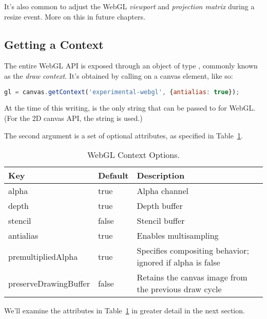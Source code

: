 \begin{sidenote}
It's also common to adjust the WebGL \emph{viewport} and \emph{projection matrix} during a resize event.  More on this in future chapters.
\end{sidenote}

\subsection{Getting a Context}
\label{sec:context}

The entire WebGL API is exposed through an object of type  , commonly known as the  \emph{draw context}.  It's obtained by calling   on a canvas element, like so:

\begin{lstlisting}[language=JavaScript]
  gl = canvas.getContext('experimental-webgl', {antialias: true});
\end{lstlisting}

At the time of this writing,   is the only string that can be passed to  for WebGL.  (For the 2D canvas API, the string  is used.)

The second argument is a set of optional attributes, as specified in Table~\ref{tab:ContextAttributes}.

\begin{table}[htb]\centering
  \begin{tabular}{lll}
    \hline
    Key & Default & Description \\
    \hline
    alpha & true & Alpha channel \\
    depth & true & Depth buffer \\
    stencil & false & Stencil buffer \\
    antialias & true & Enables multisampling \\
    premultipliedAlpha & true & Specifies compositing behavior; ignored if alpha is false \\
    preserveDrawingBuffer & false & Retains the canvas image from the previous draw cycle \\
    \hline
  \end{tabular}
  \caption{WebGL Context Options.}
  \label{tab:ContextAttributes}
\end{table}

We'll examine the attributes in Table~\ref{tab:ContextAttributes} in greater detail in the next section.

